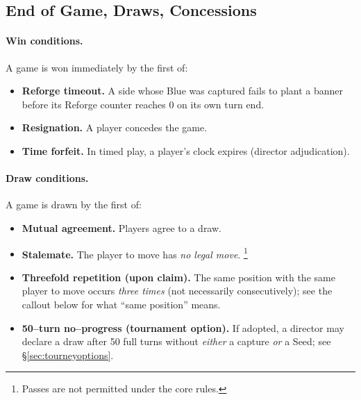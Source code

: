 \documentclass[11pt]{article}
\begin{document}
\subsection{End of Game, Draws, Concessions}
\label{sec:endgame}

\paragraph{Win conditions.}
A game is won immediately by the first of:
\begin{itemize}[leftmargin=1.3em,itemsep=0.25em]
  \item \textbf{Reforge timeout.} A side whose Blue was captured fails to plant a banner before its Reforge counter reaches 0 on its own turn end.
  \item \textbf{Resignation.} A player concedes the game.
  \item \textbf{Time forfeit.} In timed play, a player’s clock expires (director adjudication).
\end{itemize}

\paragraph{Draw conditions.}
A game is drawn by the first of:
\begin{itemize}[leftmargin=1.3em,itemsep=0.25em]
  \item \textbf{Mutual agreement.} Players agree to a draw.
  \item \textbf{Stalemate.} The player to move has \emph{no legal move}.%
  \footnote{Passes are not permitted under the core rules.}
  \item \textbf{Threefold repetition (upon claim).} The same position with the same player to move occurs \emph{three times} (not necessarily consecutively); see the callout below for what “same position” means.
  \item \textbf{50–turn no–progress (tournament option).} If adopted, a director may declare a draw after 50 full turns without \emph{either} a capture \emph{or} a Seed; see §\ref{sec:tourneyoptions}.
\end{itemize}
\end{document}
